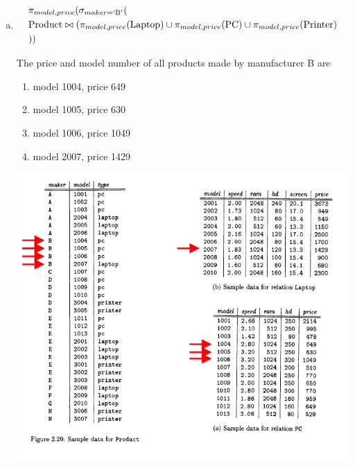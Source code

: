 \documentclass[12pt]{article}
\begin{document}
\begin{enumerate}
\begin{enumerate}[a)]
        \item

        \begin{align}
            \begin{split}
            &\pi_{model,price}(\sigma_{maker=`\text{B}'}(\\
            &\text{Product} \bowtie (\pi_{model,price}(\text{Laptop}) \cup \pi_{model,price}(\text{PC}) \cup \pi_{model,price}(\text{Printer})\\
            &))
            \end{split}
        \end{align}

        \bigskip

        The price and model number of all products made by manufacturer B are


        \begin{enumerate}[1.]
            \item model 1004, price 649
            \item model 1005, price 630
            \item model 1006, price 1049
            \item model 2007, price 1429
        \end{enumerate}

        \begin{center}
        \includegraphics[width=\linewidth]{images/worksheet_2_solution_8.png}
        \end{center}



\end{enumerate}
\end{enumerate}
\end{document}
